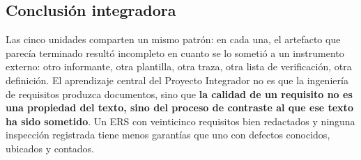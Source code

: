 \subsection{Conclusi\'on integradora}

Las cinco unidades comparten un mismo patr\'on: en cada una, el artefacto que parec\'ia terminado result\'o incompleto en cuanto se lo someti\'o a un instrumento externo: otro informante, otra plantilla, otra traza, otra lista de verificaci\'on, otra definici\'on. El aprendizaje central del Proyecto Integrador no es que la ingenier\'ia de requisitos produzca documentos, sino que \textbf{la calidad de un requisito no es una propiedad del texto, sino del proceso de contraste al que ese texto ha sido sometido}. Un ERS con veinticinco requisitos bien redactados y ninguna inspecci\'on registrada tiene menos garant\'ias que uno con defectos conocidos, ubicados y contados.
